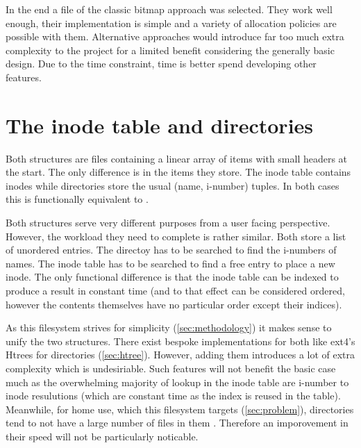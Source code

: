         In the end a file of the classic bitmap approach was selected. They
        work well enough, their implementation is simple and a variety of
        allocation policies are possible with them. Alternative approaches
        would introduce far too much extra complexity to the project for a
        limited benefit considering the generally basic design. Due to the time
        constraint, time is better spend developing other features.

    \section{The inode table and directories}

        Both structures are files containing a linear array of items with small
        headers at the start. The only difference is in the items they store.
        The inode table contains inodes while directories store the usual
        (name, i-number) tuples. In both cases this is functionally equivalent
        to .

        Both structures serve very different purposes from a user facing
        perspective. However, the workload they need to complete is rather
        similar. Both store a list of unordered entries. The directoy has to be
        searched to find the i-numbers of names. The inode table has to be
        searched to find a free entry to place a new inode. The only functional
        difference is that the inode table can be indexed to produce a result
        in constant time (and to that effect can be considered ordered, however
        the contents themselves have no particular order except their indices).

        As this filesystem strives for simplicity (\autoref{sec:methodology}) it
        makes sense to unify the two structures. There exist bespoke
        implementations for both like ext4's Htrees for directories
        (\autoref{sec:htree}). However, adding them introduces a lot of extra
        complexity which is undesiriable. Such features will not benefit the
        basic case much as the overwhelming majority of lookup in the inode
        table are i-number to inode resulutions (which are constant time as the
        index is reused in the table). Meanwhile, for home use, which this
        filesystem targets (\autoref{sec:problem}), directories tend to not have a
        large number of files in them \cite{contents_study}. Therefore an
        imporovement in their speed will not be particularly noticable.

